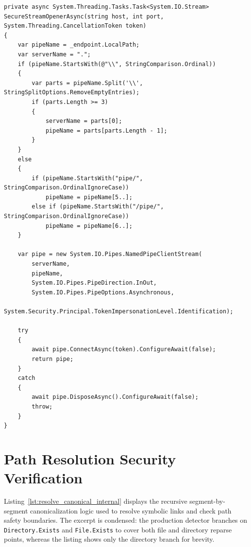 \begin{lstlisting}[language=CSharp, caption={Custom SecureStreamOpenerAsync with Identification Impersonation}, label={lst:secure_stream_opener_async}]
private async System.Threading.Tasks.Task<System.IO.Stream> SecureStreamOpenerAsync(string host, int port, System.Threading.CancellationToken token)
{
    var pipeName = _endpoint.LocalPath;
    var serverName = ".";
    if (pipeName.StartsWith(@"\\", StringComparison.Ordinal))
    {
        var parts = pipeName.Split('\\', StringSplitOptions.RemoveEmptyEntries);
        if (parts.Length >= 3)
        {
            serverName = parts[0];
            pipeName = parts[parts.Length - 1];
        }
    }
    else
    {
        if (pipeName.StartsWith("pipe/", StringComparison.OrdinalIgnoreCase))
            pipeName = pipeName[5..];
        else if (pipeName.StartsWith("/pipe/", StringComparison.OrdinalIgnoreCase))
            pipeName = pipeName[6..];
    }

    var pipe = new System.IO.Pipes.NamedPipeClientStream(
        serverName,
        pipeName,
        System.IO.Pipes.PipeDirection.InOut,
        System.IO.Pipes.PipeOptions.Asynchronous,
        System.Security.Principal.TokenImpersonationLevel.Identification);

    try
    {
        await pipe.ConnectAsync(token).ConfigureAwait(false);
        return pipe;
    }
    catch
    {
        await pipe.DisposeAsync().ConfigureAwait(false);
        throw;
    }
}
\end{lstlisting}

\section{Path Resolution Security Verification}
Listing~\ref{lst:resolve_canonical_internal} displays the recursive segment-by-segment canonicalization logic used to resolve symbolic links and check path safety boundaries. The excerpt is condensed: the production detector branches on \texttt{Directory.Exists} and \texttt{File.Exists} to cover both file and directory reparse points, whereas the listing shows only the directory branch for brevity.


